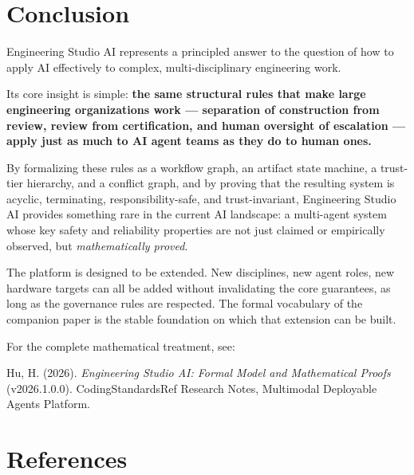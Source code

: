 \documentclass[12pt]{article}
\begin{document}
\section{Conclusion}
\label{sec:conclusion}

Engineering Studio AI represents a principled answer to the question
of how to apply AI effectively to complex, multi-disciplinary
engineering work.

Its core insight is simple: \textbf{the same structural rules that
make large engineering organizations work --- separation of
construction from review, review from certification, and human
oversight of escalation --- apply just as much to AI agent teams as
they do to human ones.}

By formalizing these rules as a workflow graph, an artifact state
machine, a trust-tier hierarchy, and a conflict graph, and by proving
that the resulting system is acyclic, terminating, responsibility-safe,
and trust-invariant, Engineering Studio AI provides something rare in
the current AI landscape: a multi-agent system whose key safety and
reliability properties are not just claimed or empirically observed,
but \emph{mathematically proved}.

The platform is designed to be extended.
New disciplines, new agent roles, new hardware targets can all be
added without invalidating the core guarantees, as long as the
governance rules are respected.
The formal vocabulary of the companion paper is the stable foundation
on which that extension can be built.

\bigskip
\noindent
For the complete mathematical treatment, see:
\medskip

\noindent
Hu, H. (2026).
\textit{Engineering Studio AI: Formal Model and Mathematical Proofs}
(v2026.1.0.0).
CodingStandardsRef Research Notes, Multimodal Deployable Agents Platform.

\newpage
\section*{References}
\label{sec:references}
\end{document}
